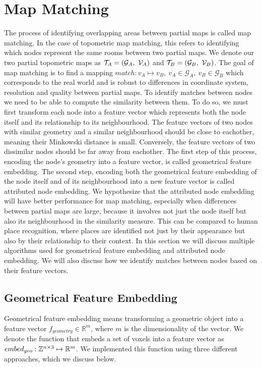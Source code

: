 \documentclass{article}
\begin{document}
\section{Map Matching}
The process of identifying overlapping areas between partial maps is called map matching. In the case of topometric map matching, this refers to identifying which nodes represent the same rooms between two partial maps. We denote our two partial topometric maps as \(\topometricmap_A = (\mathcal{G}_A,\ \voxelgrid_A)\) and \(\mathcal{T}_B = (\mathcal{G}_B,\ \mathcal{V}_B)\). The goal of map matching is to find a mapping \(match: v_A \mapsto v_B,\ v_A \in \mathcal{G}_A,\ v_B \in \mathcal{G}_B\) which corresponds to the real world and is robust to differences in coordinate system, resolution and quality between partial maps. To identify matches between nodes we need to be able to compute the similarity between them. To do so, we must first transform each node into a feature vector which represents both the node itself and its relationship to its neighbourhood. The feature vectors of two nodes with similar geometry and a similar neighbourhood should be close to eachother, meaning their Minkowski distance is small. Conversely, the feature vectors of two dissimilar nodes should be far away from eachother. The first step of this process, encoding the node's geometry into a feature vector, is called geometrical feature embedding. The second step, encoding both the geometrical feature embedding of the node itself and of its neighbourhood into a new feature vector is called attributed node embedding. We hypothesize that the attributed node embedding will have better performance for map matching, especially when differences between partial maps are large, because it involves not just the node itself but also its neighbourhood in the similarity measure. This can be compared to human place recognition, where places are identified not just by their appearance but also by their relationship to their context. In this section we will discuss multiple algorithms used for geometrical feature embedding and attributed node embedding. We will also discuss how we identify matches between nodes based on their feature vectors.

\subsection{Geometrical Feature Embedding}
Geometrical feature embedding means transforming a geometric object into a feature vector \(f_{geometry} \in \mathbb{R}^m\), where \(m\) is the dimensionality of the vector. We denote the function that embeds a set of voxels into a feature vector as \(embed_{geo}: \mathbb{Z}^{n \times 3} \mapsto \mathbb{R}^m\). We implemented this function using three different approaches, which we discuss below.
\end{document}
